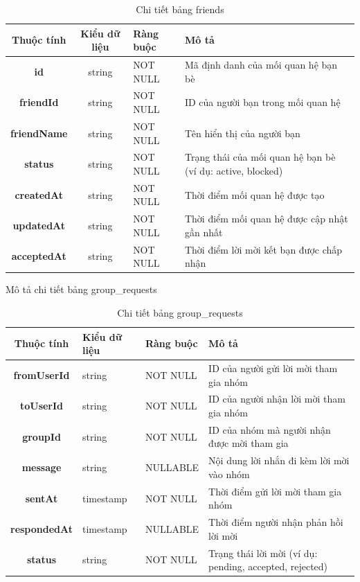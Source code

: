 \documentclass[../DoAn.tex]{subfiles}
\begin{document}
\begin{table}[H]
\centering
\begin{tabular}{|c|c|l|p{7cm}|}
\hline
\textbf{Thuộc tính} & \textbf{Kiểu dữ liệu} & \textbf{Ràng buộc} & \textbf{Mô tả} \\ \hline
\textbf{id} & string & NOT NULL & Mã định danh của mối quan hệ bạn bè \\ \hline
\textbf{friendId} & string & NOT NULL & ID của người bạn trong mối quan hệ \\ \hline
\textbf{friendName} & string & NOT NULL & Tên hiển thị của người bạn \\ \hline
\textbf{status} & string & NOT NULL & Trạng thái của mối quan hệ bạn bè (ví dụ: active, blocked) \\ \hline
\textbf{createdAt} & string & NOT NULL & Thời điểm mối quan hệ được tạo \\ \hline
\textbf{updatedAt} & string & NOT NULL & Thời điểm mối quan hệ được cập nhật gần nhất \\ \hline
\textbf{acceptedAt} & string  & NOT NULL & Thời điểm lời mời kết bạn được chấp nhận \\ \hline
\end{tabular}
\caption{Chi tiết bảng friends}
\label{tab:friendsTable}
\end{table}

Mô tả chi tiết bảng group\_requests
\begin{table}[H]
\centering
\begin{tabular}{|c|p{3.5cm}|l|p{6cm}|}
\hline
\textbf{Thuộc tính} & \textbf{Kiểu dữ liệu} & \textbf{Ràng buộc} & \textbf{Mô tả} \\ \hline
\textbf{fromUserId} & string & NOT NULL & ID của người gửi lời mời tham gia nhóm \\ \hline
\textbf{toUserId} & string & NOT NULL & ID của người nhận lời mời tham gia nhóm \\ \hline
\textbf{groupId} & string & NOT NULL & ID của nhóm mà người nhận được mời tham gia \\ \hline
\textbf{message} & string & NULLABLE & Nội dung lời nhắn đi kèm lời mời vào nhóm \\ \hline
\textbf{sentAt} & timestamp & NOT NULL & Thời điểm gửi lời mời tham gia nhóm \\ \hline
\textbf{respondedAt} & timestamp & NULLABLE & Thời điểm người nhận phản hồi lời mời \\ \hline
\textbf{status} & string & NOT NULL & Trạng thái lời mời (ví dụ: pending, accepted, rejected) \\ \hline
\end{tabular}
\caption{Chi tiết bảng group\_requests}
\label{tab:groupRequestsTable}
\end{table}
\end{document}
